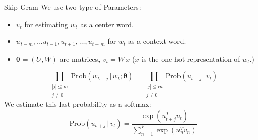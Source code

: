 \documentclass[9pt]{beamer}
\newcommand{\Prob}{\text{Prob}}
\newcommand{\btheta}{\pmb{\theta}}
\newcommand{\given}{\, | \,}
\begin{document}
\begin{frame}{Skip-Gram }
    We use two type of Parameters:
    \begin{itemize}
            \item $v_t$ for estimating $w_t$ as a center word.
            \item $u_{t-m}, \ldots u_{t-1}, u_{t+1}, \ldots , u_{t+m}$ for $w_t$ as a context word.
            \item $\btheta = (U,W)$ are matrices, $v_t = W\, x$ ($x$ is the one-hot representation of $w_t$.)
    \end{itemize}
    $$\prod_{\substack{|j|\leq m\\ j\neq 0}}\Prob(w_{t+j}\given w_t; \btheta) =    \prod_{\substack{|j|\leq m\\ j\neq 0} } \Prob(u_{t+j} \given v_t)$$
    We estimate this last probability as a softmax:
    $$\Prob(u_{t+j}\given v_t) = \frac{\exp(u^T_{t+j}v_t)}{ \sum_{n=1}^V \exp(u_n^T v_n)}$$
\end{frame}
\end{document}
